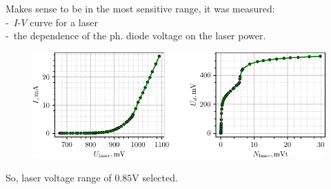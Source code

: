 
Makes sense to be in the most sensitive range, it was measured: \\
 -\ $I$-$V$ curve  for a laser \\
 -\ the dependence of the ph. diode voltage on the laser power.

\begin{figure}[h]
    \includegraphics[width=1.0\textwidth]{figures/IV.pdf}
\end{figure}

So, laser voltage range of  $0.85$V selected.